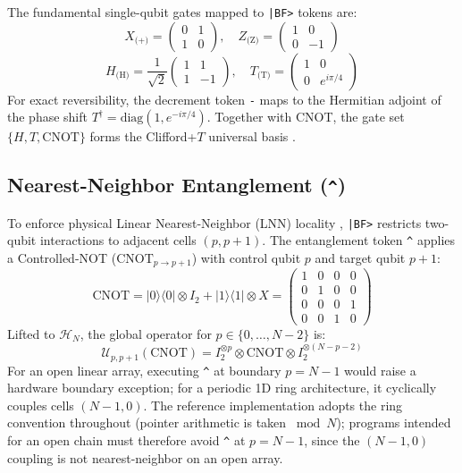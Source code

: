 \documentclass[11pt,a4paper,twocolumn]{article}
\newcommand{\ketbra}[2]{| #1 \rangle\langle #2 |}
\begin{document}
The fundamental single-qubit gates mapped to \texttt{|BF>} tokens are:
\begin{equation}
    X_{\text{(+)}} = \begin{pmatrix} 0 & 1 \\ 1 & 0 \end{pmatrix}, \quad
    Z_{\text{(Z)}} = \begin{pmatrix} 1 & 0 \\ 0 & -1 \end{pmatrix}
\end{equation}
\begin{equation}
    H_{\text{(H)}} = \frac{1}{\sqrt{2}}\begin{pmatrix} 1 & 1 \\ 1 & -1 \end{pmatrix}, \quad
    T_{\text{(T)}} = \begin{pmatrix} 1 & 0 \\ 0 & e^{i\pi/4} \end{pmatrix}
\end{equation}
For exact reversibility, the decrement token \texttt{-} maps to the Hermitian adjoint of the phase shift $T^\dagger = \text{diag}(1, e^{-i\pi/4})$. Together with CNOT, the gate set $\{H, T, \text{CNOT}\}$ forms the Clifford+$T$ universal basis \cite{boykin1999optimal,bravyi2005universal}.

\subsection{Nearest-Neighbor Entanglement (\texttt{\^{}})}
To enforce physical Linear Nearest-Neighbor (LNN) locality \cite{fowler2004lnn,saeedi2011lnn}, \texttt{|BF>} restricts two-qubit interactions to adjacent cells $(p, p+1)$. The entanglement token \texttt{\^{}} applies a Controlled-NOT ($\text{CNOT}_{p \to p+1}$) with control qubit $p$ and target qubit $p+1$:
\begin{equation}
    \text{CNOT} = \ketbra{0}{0} \otimes I_2 + \ketbra{1}{1} \otimes X = \begin{pmatrix} 1 & 0 & 0 & 0 \\ 0 & 1 & 0 & 0 \\ 0 & 0 & 0 & 1 \\ 0 & 0 & 1 & 0 \end{pmatrix}
\end{equation}
Lifted to $\mathcal{H}_N$, the global operator for $p \in \{0, \dots, N-2\}$ is:
\begin{equation}
    \mathcal{U}_{p, p+1}(\text{CNOT}) = I_2^{\otimes p} \otimes \text{CNOT} \otimes I_2^{\otimes (N - p - 2)}
\end{equation}
For an open linear array, executing \texttt{\^{}} at boundary $p = N-1$ would raise a hardware boundary exception; for a periodic 1D ring architecture, it cyclically couples cells $(N-1, 0)$. The reference implementation adopts the ring convention throughout (pointer arithmetic is taken $\bmod N$); programs intended for an open chain must therefore avoid \texttt{\^{}} at $p = N-1$, since the $(N-1, 0)$ coupling is not nearest-neighbor on an open array.
\end{document}
